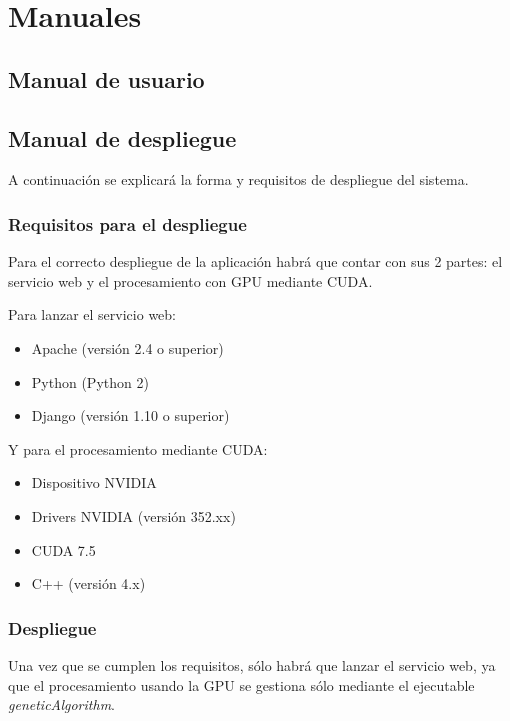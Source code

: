 \chapter{Manuales}


\section{Manual de usuario}
\bigskip





\section{Manual de despliegue}
\bigskip

A continuación se explicará la forma y requisitos de despliegue del sistema. 

\subsection{Requisitos para el despliegue}
\bigskip

Para el correcto despliegue de la aplicación habrá que contar con sus 2 partes: el servicio web y el procesamiento con GPU mediante CUDA.

\bigskip
Para lanzar el servicio web:
\begin{itemize}
	\item Apache (versión 2.4 o superior)
	\item Python (Python 2)
	\item Django  (versión 1.10 o superior)
\end{itemize} 

\bigskip
Y para el procesamiento mediante CUDA:
\begin{itemize}
	\item Dispositivo NVIDIA
	\item Drivers NVIDIA (versión 352.xx)
	\item CUDA 7.5
	\item C++ (versión 4.x)
\end{itemize} 

\subsection{Despliegue}
\bigskip


Una vez que se cumplen los requisitos, sólo habrá que lanzar el servicio web, ya que el procesamiento usando la GPU se gestiona sólo mediante el ejecutable \textit{geneticAlgorithm}.


